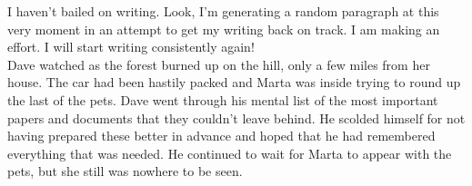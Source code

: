 \documentclass{standalone}
\begin{document}
	I haven't bailed on writing. Look, I'm generating a random paragraph at this very moment in an attempt to get my writing back on track. I am making an effort. I will start writing consistently again!\\
	
	Dave watched as the forest burned up on the hill, only a few miles from her house. The car had been hastily packed and Marta was inside trying to round up the last of the pets. Dave went through his mental list of the most important papers and documents that they couldn't leave behind. He scolded himself for not having prepared these better in advance and hoped that he had remembered everything that was needed. He continued to wait for Marta to appear with the pets, but she still was nowhere to be seen.	
	
\end{document}
